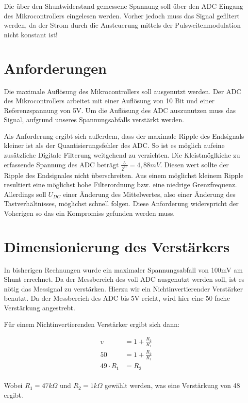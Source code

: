 \documentclass[11pt,twoside,a4paper,openright]{mpreport}
\begin{document}
Die über den Shuntwiderstand gemessene Spannung soll über den ADC Eingang des Mikrocontrollers eingelesen werden. Vorher jedoch muss das Signal gefiltert werden, da der Strom
durch die Ansteuerung mittels der Pulsweitenmodulation nicht konstant ist!



\section{Anforderungen}
Die maximale Auflösung des Mikrocontrollers soll ausgenutzt werden. Der ADC des Mikrocontrollers arbeitet mit einer Auflösung von 10 Bit und einer 
Referenzspannung von 5V. Um die Auflösung des ADC auszunutzen muss das Signal, aufgrund unseres Spannungsabfalls verstärkt werden.

Als Anforderung ergibt sich außerdem, dass der maximale Ripple des Endsignals kleiner ist als der Quantisierungsfehler des ADC.
So ist es möglich aufeine zusätzliche Digitale Filterung weitgehend zu verzichten.
Die Kleistmöglkiche zu erfassende Spannung des ADC beträgt $\frac{5}{2^{10}}=4,88mV$.
Diesen wert sollte der Ripple des Endsignales nicht überschreiten.
Aus einem möglichst kleinem Ripple resultiert eine möglichst hohe Filterordnung bzw. eine niedrige Grenzfrequenz.
Allerdings soll $U_{DC}$ einer Änderung des Mittelwertes, also einer Änderung des Tastverhältnisses, möglichst
schnell folgen. Diese Anforderung widerspricht der Voherigen so das ein Kompromiss gefunden werden muss.

\section{Dimensionierung des Verstärkers}

In bisherigen Rechnungen wurde ein maximaler Spannungsabfall von 100mV am Shunt errechnet. Da der Messbereich des voll ADC ausgenutzt werden soll,
ist es nötig das Messignal zu verstärken. Hierzu wir ein Nichtinvertierender Verstärker benutzt. Da der Messbereich des ADC bis 5V reicht, wird hier eine 
50 fache Verstärkung angestrebt.

Für einem Nichtinvertierenden Verstärker ergibt sich dann:

\begin{align*}
v &= 1 + \frac{R_2}{R_1}\\
50 &= 1 + \frac{R_2}{R_1}\\
49\cdot R_1 &= R_2
\end{align*}
\\
Wobei $R_1 = 47 k\Omega$ und $R_2 = 1 k\Omega$  gewählt werden, was eine Verstärkung von 48 ergibt.
\end{document}
